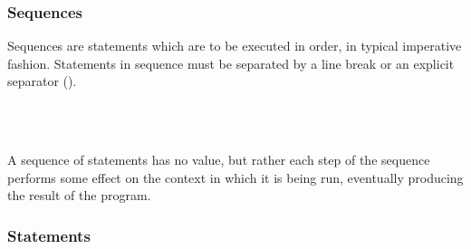 \begin{prooftree}
\end{prooftree}

\begin{prooftree}
\end{prooftree}

\subsubsection{Sequences}

Sequences are statements which are to be executed in order, in typical
imperative fashion. Statements in sequence must be separated by a line break or
an explicit separator (\op{,}).

\begin{bnf*}
     \\
     \\
\end{bnf*}

A sequence of statements has no value, but rather each step of the sequence
performs some effect on the context in which it is being run, eventually
producing the result of the program.

\begin{prooftree}
\end{prooftree}

\begin{prooftree}
\end{prooftree}

\subsubsection{Statements}

